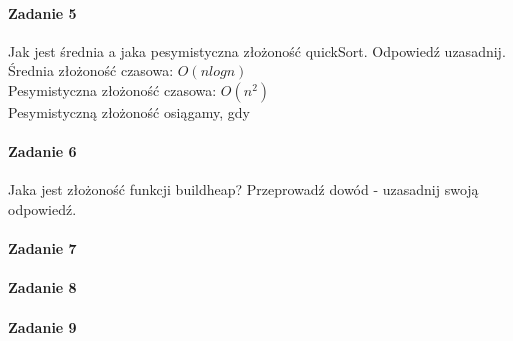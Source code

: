 \documentclass[18pt]{extarticle}
\begin{document}
\paragraph{Zadanie 5} Jak jest średnia a jaka pesymistyczna złożoność quickSort. Odpowiedź uzasadnij. \\


Średnia złożoność czasowa: $O(nlogn)$ \\
Pesymistyczna złożoność czasowa: $O(n^2)$ \\
Pesymistyczną złożoność osiągamy, gdy 

\paragraph{Zadanie 6} Jaka jest złożoność funkcji buildheap? Przeprowadź dowód - uzasadnij swoją odpowiedź.

\paragraph{Zadanie 7} 

\paragraph{Zadanie 8} 

\paragraph{Zadanie 9} 
\end{document}
